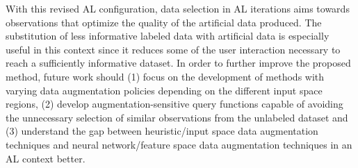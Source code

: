\documentclass[10pt,journal,compsoc]{IEEEtran}
\begin{document}
With this revised AL configuration, data selection in AL iterations aims
towards observations that optimize the quality of the artificial data
produced. The substitution of less informative labeled data with artificial
data is especially useful in this context since it reduces some of the user
interaction necessary to reach a sufficiently informative dataset. In order
to further improve the proposed method, future work should (1) focus on the
development of methods with varying data augmentation policies depending on
the different input space regions, (2) develop augmentation-sensitive query
functions capable of avoiding the unnecessary selection of similar
observations from the unlabeled dataset and (3) understand the gap between
heuristic/input space data augmentation techniques and neural network/feature
space data augmentation techniques in an AL context better.












































































\end{document}
